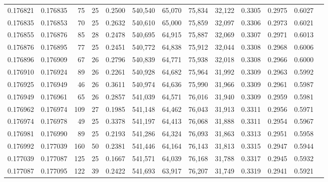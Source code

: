 \begin{tabular}{rrrrrrrrrrrrr}
0.176821 & 0.176835 &  75 &  25 &                                     0.2500 & 540,540 &  65,070 &  75,834 &  32,122 & 0.3305 & 0.2975 & 0.6027 \\
0.176835 & 0.176853 &  70 &  25 &                                     0.2632 & 540,610 &  65,000 &  75,859 &  32,097 & 0.3306 & 0.2973 & 0.6021 \\
0.176855 & 0.176876 &  85 &  28 &                                     0.2478 & 540,695 &  64,915 &  75,887 &  32,069 & 0.3307 & 0.2971 & 0.6013 \\
0.176876 & 0.176895 &  77 &  25 &                                     0.2451 & 540,772 &  64,838 &  75,912 &  32,044 & 0.3308 & 0.2968 & 0.6006 \\
0.176896 & 0.176909 &  67 &  26 &                                     0.2796 & 540,839 &  64,771 &  75,938 &  32,018 & 0.3308 & 0.2966 & 0.6000 \\
0.176910 & 0.176924 &  89 &  26 &                                     0.2261 & 540,928 &  64,682 &  75,964 &  31,992 & 0.3309 & 0.2963 & 0.5992 \\
0.176925 & 0.176949 &  46 &  26 &                                     0.3611 & 540,974 &  64,636 &  75,990 &  31,966 & 0.3309 & 0.2961 & 0.5987 \\
0.176949 & 0.176961 &  65 &  26 &                                     0.2857 & 541,039 &  64,571 &  76,016 &  31,940 & 0.3309 & 0.2959 & 0.5981 \\
0.176962 & 0.176974 & 109 &  27 &                                     0.1985 & 541,148 &  64,462 &  76,043 &  31,913 & 0.3311 & 0.2956 & 0.5971 \\
0.176974 & 0.176978 &  49 &  25 &                                     0.3378 & 541,197 &  64,413 &  76,068 &  31,888 & 0.3311 & 0.2954 & 0.5967 \\
0.176981 & 0.176990 &  89 &  25 &                                     0.2193 & 541,286 &  64,324 &  76,093 &  31,863 & 0.3313 & 0.2951 & 0.5958 \\
0.176992 & 0.177039 & 160 &  50 &                                     0.2381 & 541,446 &  64,164 &  76,143 &  31,813 & 0.3315 & 0.2947 & 0.5944 \\
0.177039 & 0.177087 & 125 &  25 &                                     0.1667 & 541,571 &  64,039 &  76,168 &  31,788 & 0.3317 & 0.2945 & 0.5932 \\
0.177087 & 0.177095 & 122 &  39 &                                     0.2422 & 541,693 &  63,917 &  76,207 &  31,749 & 0.3319 & 0.2941 & 0.5921 \\

\end{tabular}

